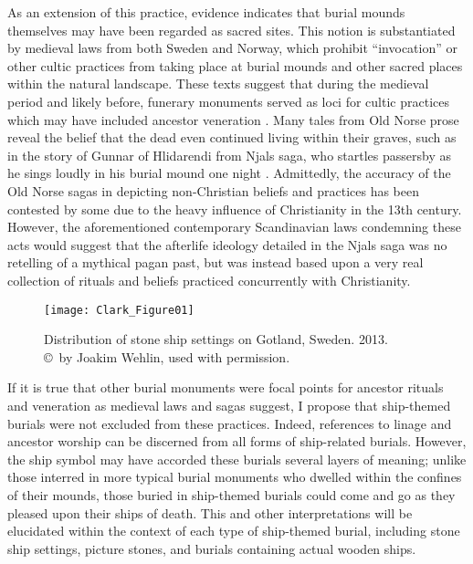 As an extension of this practice, evidence indicates that burial mounds themselves may have been regarded as sacred sites. This notion is substantiated by medieval laws from both Sweden and Norway, which prohibit “invocation” or other cultic practices from taking place at burial mounds and other sacred places within the natural landscape. These texts suggest that during the medieval period and likely before, funerary monuments served as loci for cultic practices which may have included ancestor veneration \parencite[198--199]{Sundqvist_2015}.
Many tales from Old Norse prose reveal the belief that the dead even continued living within their graves, such as in the story of Gunnar of Hlidarendi from Njals saga, who startles passersby as he sings loudly in his burial mound one night \parencite[261]{Price_2008}. Admittedly, the accuracy of the Old Norse sagas in depicting non-Christian beliefs and practices has been contested by some due to the heavy influence of Christianity in the 13th century. However, the aforementioned contemporary Scandinavian laws condemning these acts would suggest that the afterlife ideology detailed in the Njals saga was no retelling of a mythical pagan past, but was instead based upon a very real collection of rituals and beliefs practiced concurrently with Christianity.

\begin{figure}[!p]
	\texttt{[image: Clark\_Figure01]}
	\caption{Distribution of stone ship settings on Gotland, Sweden. 2013.
		{\normalfont\scriptsize \\ \copyright\ by Joakim Wehlin, used with permission.
	}}
	\label{fig:Clark_Figure01}
\end{figure}
If it is true that other burial monuments were focal points for ancestor rituals and veneration as medieval laws and sagas suggest, I propose that ship-themed burials were not excluded from these practices. Indeed, references to linage and ancestor worship can be discerned from all forms of ship-related burials. However, the ship symbol may have accorded these burials several layers of meaning; unlike those interred in more typical burial monuments who dwelled within the confines of their mounds, those buried in ship-themed burials could come and go as they pleased upon their ships of death. This and other interpretations will be elucidated within the context of each type of ship-themed burial, including stone ship settings, picture stones, and burials containing actual wooden ships.

